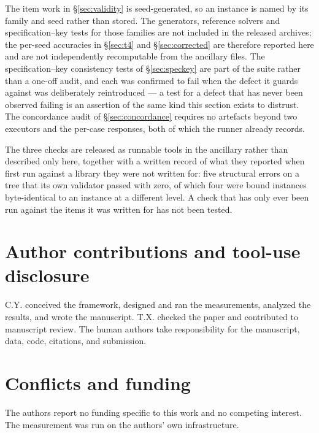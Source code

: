 \documentclass[11pt]{article}
\theoremstyle{definition}
\begin{document}
The item work in \S\ref{sec:validity} is seed-generated, so an instance is named by its family and seed rather than stored. The generators, reference solvers and specification--key tests for those families are not included in the released archives; the per-seed accuracies in \S\ref{sec:t4} and \S\ref{sec:corrected} are therefore reported here and are not independently recomputable from the ancillary files. The specification--key consistency tests of \S\ref{sec:speckey} are part of the suite rather than a one-off audit, and each was confirmed to fail when the defect it guards against was deliberately reintroduced --- a test for a defect that has never been observed failing is an assertion of the same kind this section exists to distrust. The concordance audit of \S\ref{sec:concordance} requires no artefacts beyond two executors and the per-case responses, both of which the runner already records.

The three checks are released as runnable tools in the ancillary  rather than described only here, together with a written record of what they reported when first run against a library they were not written for: five structural errors on a tree that its own validator passed with zero, of which four were bound instances byte-identical to an instance at a different level. A check that has only ever been run against the items it was written for has not been tested.

\section*{Author contributions and tool-use disclosure}

C.Y. conceived the framework, designed and ran the measurements, analyzed the results, and wrote the manuscript. T.X. checked the paper and contributed to manuscript review. The human authors take responsibility for the manuscript, data, code, citations, and submission.

\section*{Conflicts and funding}

The authors report no funding specific to this work and no competing interest. The measurement was run on the authors' own infrastructure.




\appendix
\end{document}
